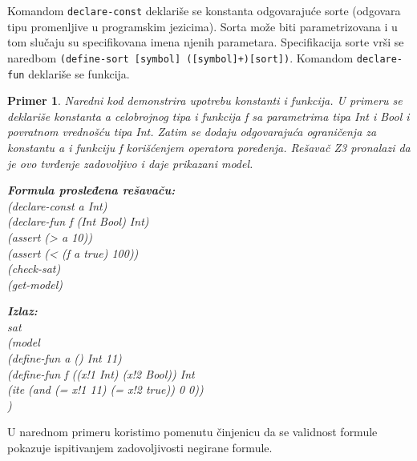 \documentclass[12pt,oneside]{memoir}
\newcommand\tab[1][0.5cm]{\hspace*{#1}}
\newtheorem{primer}{Primer}
\begin{document}
Komandom \texttt{declare-const} deklariše se konstanta odgovarajuće sorte (odgovara tipu promenljive u programskim jezicima). Sorta može biti parametrizovana i u tom slučaju su specifikovana imena njenih parametara. Specifikacija sorte vrši se naredbom \texttt{(define-sort [symbol] ([symbol]+)[sort])}.
Komandom \texttt{declare-fun} deklariše se funkcija. 
\begin{primer} Naredni kod demonstrira upotrebu konstanti i funkcija. U primeru se deklariše konstanta a celobrojnog tipa i funkcija f sa parametrima tipa Int i Bool i povratnom vrednošću tipa Int. Zatim se dodaju odgovarajuća ograničenja za konstantu a i funkciju f korišćenjem operatora poređenja. Rešavač Z3 pronalazi da je ovo tvrđenje zadovoljivo i daje prikazani model. 
\\ 

\hspace{-0.7cm}
\begin{minipage}[b]{0.43\textwidth}
\textbf{Formula prosleđena rešavaču:}\\
(declare-const a Int)\\
(declare-fun f (Int Bool) Int)\\
(assert (> a 10))\\
(assert (< (f a true) 100))\\
(check-sat)\\
(get-model) \\
\end{minipage}
\hspace{0.6cm}
\begin{minipage}[t]{0.5\textwidth}
\vspace{-4.715cm}
\textbf{Izlaz:}
\\sat 
\\(model 
\\\tab(define-fun a () Int 11) 
\\\tab(define-fun f ((x!1 Int) (x!2 Bool)) Int 
\\\tab(ite (and (= x!1 11) (= x!2 true)) 0 0))
\\)
\end{minipage}
\end{primer}

U narednom primeru koristimo pomenutu činjenicu da se validnost formule pokazuje ispitivanjem zadovoljivosti negirane formule. 
\end{document}
